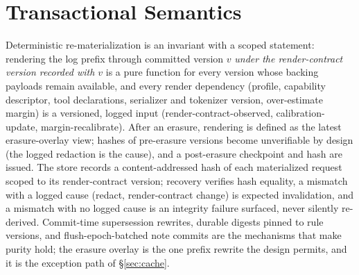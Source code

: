 \documentclass[11pt]{article}
\begin{document}
\section{Transactional Semantics}
\label{sec:txn}

Deterministic re-materialization is an invariant with a scoped statement: rendering the log prefix through committed version $v$ \emph{under the render-contract version recorded with $v$} is a pure function for every version whose backing payloads remain available, and every render dependency (profile, capability descriptor, tool declarations, serializer and tokenizer version, over-estimate margin) is a versioned, logged input (render-contract-observed, calibration-update, margin-recalibrate). After an erasure, rendering is defined as the latest erasure-overlay view; hashes of pre-erasure versions become unverifiable by design (the logged redaction is the cause), and a post-erasure checkpoint and hash are issued. The store records a content-addressed hash of each materialized request scoped to its render-contract version; recovery verifies hash equality, a mismatch with a logged cause (redact, render-contract change) is expected invalidation, and a mismatch with no logged cause is an integrity failure surfaced, never silently re-derived. Commit-time supersession rewrites, durable digests pinned to rule versions, and flush-epoch-batched note commits are the mechanisms that make purity hold; the erasure overlay is the one prefix rewrite the design permits, and it is the exception path of \S\ref{sec:cache}.
\end{document}
